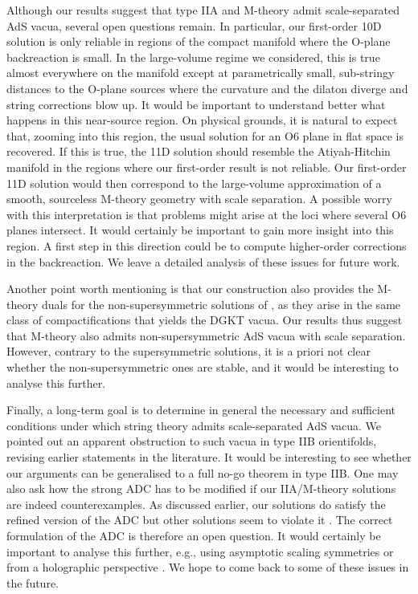 \documentclass[11pt]{article}
\renewcommand{\[}{\left[}
\renewcommand{\]}{\right]}
\renewcommand{\(}{\left(}
\renewcommand{\)}{\right)}
\newcommand{\<}{\langle}
\renewcommand{\>}{\rangle}
\begin{document}
Although our results suggest that type IIA and M-theory admit scale-separated AdS vacua, several open questions remain. In particular, our first-order 10D solution is only reliable in regions of the compact manifold where the O-plane backreaction is small. In the large-volume regime we considered, this is true almost everywhere on the manifold except at parametrically small, sub-stringy distances to the O-plane sources where the curvature and the dilaton diverge and string corrections blow up. It would be important to understand better what happens in this near-source region. On physical grounds, it is natural to expect that, zooming into this region, the usual solution for an O6 plane in flat space is recovered. If this is true, the 11D solution should resemble the Atiyah-Hitchin manifold \cite{Seiberg:1996nz} in the regions where our first-order result is not reliable. Our first-order 11D solution would then correspond to the large-volume approximation of a smooth, sourceless M-theory geometry with scale separation.
A possible worry with this interpretation is that problems might arise at the loci where several O6 planes intersect. It would certainly be important to gain more insight into this region. A first step in this direction could be to compute higher-order corrections in the backreaction. We leave a detailed analysis of these issues for future work.

Another point worth mentioning is that our construction also provides the M-theory duals for the non-supersymmetric solutions of \cite{Camara:2005dc, Narayan:2010em, Marchesano:2019hfb}, as they arise in the same class of compactifications that yields the DGKT vacua. Our results thus suggest that M-theory also admits non-supersymmetric AdS vacua with scale separation. However, contrary to the supersymmetric solutions, it is a priori not clear whether the non-supersymmetric ones are stable, and it would be interesting to analyse this further.

Finally, a long-term goal is to determine in general the necessary and sufficient conditions under which string theory admits scale-separated AdS vacua.
We pointed out an apparent obstruction to such vacua in type IIB orientifolds, revising earlier statements in the literature. It would be interesting to see whether our arguments can be generalised to a full no-go theorem in type IIB.
One may also ask how the strong ADC has to be modified if our IIA/M-theory solutions are indeed counterexamples. As discussed earlier, our solutions do satisfy the refined version of the ADC \cite{ Buratti:2020kda} but other solutions seem to violate it \cite{Farakos:2020phe}.
The correct formulation of the ADC is therefore an open question.
It would certainly be important to analyse this further, e.g., using asymptotic scaling symmetries \cite{Junghans:2020acz}
or from a holographic perspective \cite{Alday:2019qrf, Polchinski:2009ch}.
We hope to come back to some of these issues in the future.
\end{document}

